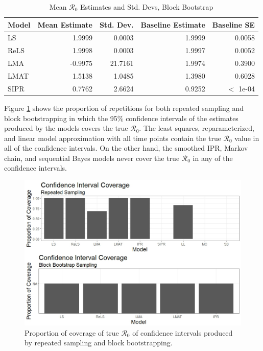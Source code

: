 \documentclass[12pt]{article}
\newcommand{\rr}{\ensuremath{\mathcal{R}_0}}
\begin{document}
\begin{table}[H]
	
	\centering
	\begin{tabular}[t]{l|r|r|r|r}
		\hline
		Model & Mean Estimate & Std. Dev. & Baseline Estimate & Baseline SE\\
		\hline
		LS & 1.9999 & 0.0003 & 1.9999 & 0.0058\\
		\hline
		ReLS & 1.9998 & 0.0003 & 1.9997 & 0.0052\\
		\hline
		LMA & -0.9975 & 21.7161 & 1.9974 & 0.3900\\
		\hline
		LMAT & 1.5138 & 1.0485 & 1.3980 & 0.6028 \\
		\hline
		SIPR & 0.7762 & 2.6624 & 0.9252 & $<$ 1e-04 \\
		\hline
	\end{tabular}
	\caption{Mean $\rr$ Estimates and Std. Devs, Block Bootstrap}
	\label{tab:bb-samp}
\end{table}

Figure \ref{fig:coverage} shows the proportion of repetitions for both repeated sampling and block bootstrapping in which the 95\% confidence intervals of the estimates produced by the models covers the true $\rr$. The least squares, reparameterized, and linear model approximation with all time points contain the true $\rr$ value in all of the confidence intervals. On the other hand, the smoothed IPR, Markov chain, and sequential Bayes models never cover the true $\rr$ in any of the confidence intervals.

\begin{figure}[H]
	\begin{center}
		\includegraphics[scale=0.5]{images/coverage.jpeg}
		\caption{Proportion of coverage of true $\rr$ of confidence intervals produced by repeated sampling and block bootstrapping.}
		\label{fig:coverage}	
	\end{center}
      \end{figure}
\end{document}
